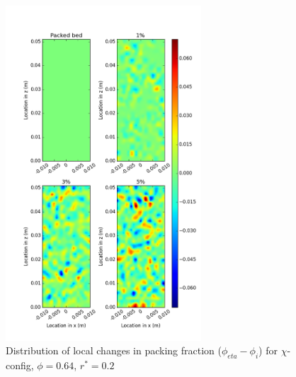 \begin{figure}[!t]
    \centering
    \includegraphics[width = 0.65\textwidth]{figures/x-62-r125-1-deltas.png}
    \caption{Distribution of local changes in packing fraction ($\phi_{eta} - \phi_i$) for $\chi$-config, $\phi = 0.64$, $r^* = 0.2$}\label{fig:x-624-r125-deltas}
\end{figure}



